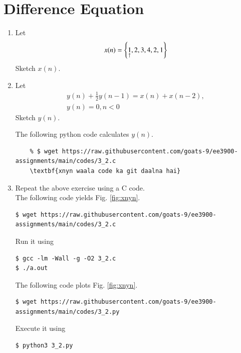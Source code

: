 \documentclass[journal,12pt,twocolumn]{IEEEtran}
\renewcommand\thesection{\arabic{section}}
\begin{document}
\section{Difference Equation}
\begin{enumerate}[label=\thesection.\arabic*,ref=\thesection.\theenumi]
\item Let
\begin{equation}
x(n) = \left\{\underset{\uparrow}{1},2,3,4,2,1\right\}
\end{equation}
Sketch $x(n)$.
\item Let
\begin{multline}
\label{eq:iir_filter}
y(n) + \frac{1}{2}y(n-1) = x(n) + x(n-2), 
\\
y(n) = 0, n < 0
\end{multline}
Sketch $y(n)$.

\solution The following python code calculates $y(n)$.
\begin{lstlisting}
	% $ wget https://raw.githubusercontent.com/goats-9/ee3900-assignments/main/codes/3_2.c
	\textbf{xnyn waala code ka git daalna hai}
	\end{lstlisting}
\item Repeat the above exercise using a C code.
\\
\solution The following code yields Fig. \ref{fig:xnyn}.

\begin{lstlisting}
$ wget https://raw.githubusercontent.com/goats-9/ee3900-assignments/main/codes/3_2.c
\end{lstlisting}
Run it using
\begin{lstlisting}
$ gcc -lm -Wall -g -O2 3_2.c
$ ./a.out
\end{lstlisting}
The following code plots Fig. \eqref{fig:xnyn}.
\begin{lstlisting}
$ wget https://raw.githubusercontent.com/goats-9/ee3900-assignments/main/codes/3_2.py
\end{lstlisting}
Execute it using
\begin{lstlisting}
$ python3 3_2.py
\end{lstlisting}


\end{enumerate}
\end{document}
